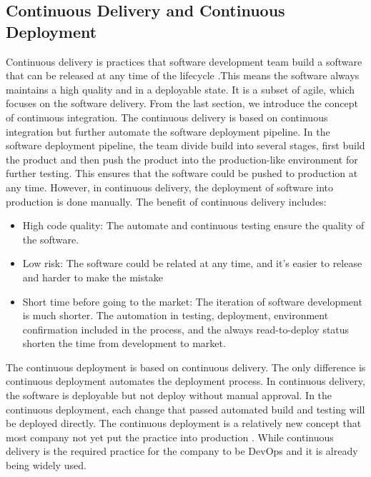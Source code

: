 \subsection{Continuous Delivery and Continuous Deployment}
\label{CD}
Continuous delivery is practices that software development team build a software that can be released at any time of the lifecycle \cite{fowler2013continuous}.This means the software always maintains a high quality and in a deployable state\cite{WhatisCo47:online}. It is a subset of agile, which focuses on the software delivery\cite{Continuo97:online}. From the last section, we introduce the concept of continuous integration. The continuous delivery is based on continuous integration but further automate the software deployment pipeline. In the software deployment pipeline, the team divide build into several stages, first build the product and then push the product into the production-like environment for further testing. This ensures that the software could be pushed to production at any time. However, in continuous delivery, the deployment of software into production is done manually.
The benefit \cite{WhatisCo47:online}\cite{fowler2013continuous} of continuous delivery includes:
\begin{itemize}
    \item High code quality: The automate and continuous testing ensure the quality of the software.
    \item Low risk: The software could be related at any time, and it's easier to release and harder to make the mistake
    \item Short time before going to the market: The iteration of software development is much shorter. The automation in testing, deployment, environment confirmation included in the process, and the always read-to-deploy status shorten the time from development to market.
\end{itemize}
The continuous deployment is based on continuous delivery. The only difference is continuous deployment automates the deployment process. In continuous delivery, the software is deployable but not deploy without manual approval. In the continuous deployment, each change that passed automated build and testing will be deployed directly. The continuous deployment is a relatively new concept that most company not yet put the practice into production \cite{leppanen2015highways}. While continuous delivery is the required practice for the company to be DevOps and it is already being widely used.

